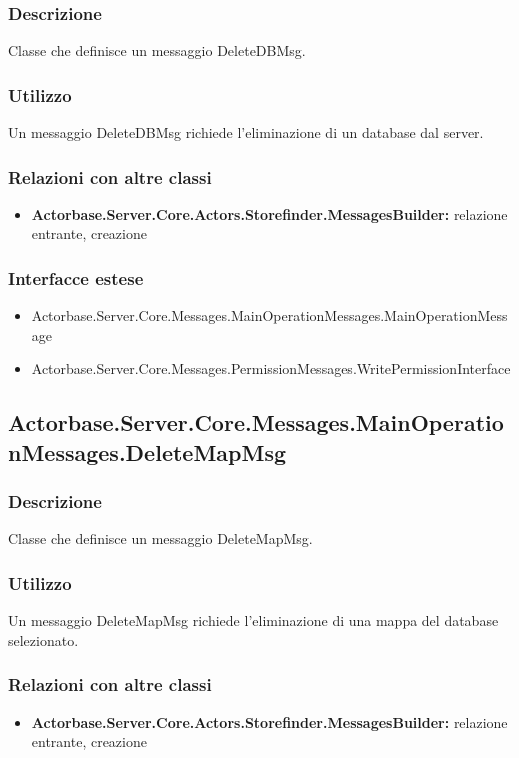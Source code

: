 \documentclass[a4paper]{article}
\begin{document}
			\subsubsection{Descrizione}
				Classe che definisce un messaggio DeleteDBMsg.
			\subsubsection{Utilizzo}
				Un messaggio DeleteDBMsg richiede l'eliminazione di un database dal server.
			\subsubsection{Relazioni con altre classi}
			\begin{itemize}
				\item \textbf{Actorbase.Server.Core.Actors.Storefinder.MessagesBuilder:} relazione entrante, creazione
			\end{itemize}
			\subsubsection{Interfacce estese}
			\begin{itemize}
				\item Actorbase.Server.Core.Messages.MainOperationMessages.MainOperationMessage
				\item Actorbase.Server.Core.Messages.PermissionMessages.WritePermissionInterface
			\end{itemize}

			\subsection{Actorbase.Server.Core.Messages.MainOperationMessages.DeleteMapMsg}
			\subsubsection{Descrizione}
				Classe che definisce un messaggio DeleteMapMsg.
			\subsubsection{Utilizzo}
				Un messaggio DeleteMapMsg richiede l'eliminazione di una mappa del database selezionato.
			\subsubsection{Relazioni con altre classi}
			\begin{itemize}
				\item \textbf{Actorbase.Server.Core.Actors.Storefinder.MessagesBuilder:} relazione entrante, creazione
			\end{itemize}
\end{document}
